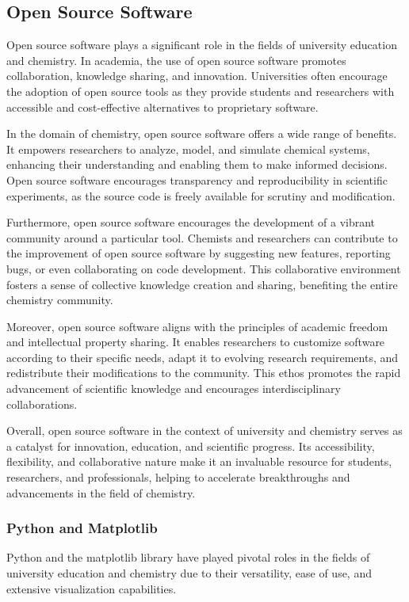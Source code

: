 \documentclass[../Master.tex]{subfiles}
\begin{document}
\subsection{Open Source Software}\label{sec:open-source-software}
Open source software plays a significant role in the fields of university education and chemistry. In academia, the use of open source software promotes collaboration, knowledge sharing, and innovation. Universities often encourage the adoption of open source tools as they provide students and researchers with accessible and cost-effective alternatives to proprietary software.

In the domain of chemistry, open source software offers a wide range of benefits. It empowers researchers to analyze, model, and simulate chemical systems, enhancing their understanding and enabling them to make informed decisions. Open source software encourages transparency and reproducibility in scientific experiments, as the source code is freely available for scrutiny and modification.

Furthermore, open source software encourages the development of a vibrant community around a particular tool. Chemists and researchers can contribute to the improvement of open source software by suggesting new features, reporting bugs, or even collaborating on code development. This collaborative environment fosters a sense of collective knowledge creation and sharing, benefiting the entire chemistry community.

Moreover, open source software aligns with the principles of academic freedom and intellectual property sharing. It enables researchers to customize software according to their specific needs, adapt it to evolving research requirements, and redistribute their modifications to the community. This ethos promotes the rapid advancement of scientific knowledge and encourages interdisciplinary collaborations.

Overall, open source software in the context of university and chemistry serves as a catalyst for innovation, education, and scientific progress. Its accessibility, flexibility, and collaborative nature make it an invaluable resource for students, researchers, and professionals, helping to accelerate breakthroughs and advancements in the field of chemistry.

\subsubsection{Python and Matplotlib}\label{sec:py-plt}
Python and the matplotlib library have played pivotal roles in the fields of university education and chemistry due to their versatility, ease of use, and extensive visualization capabilities.
\end{document}
